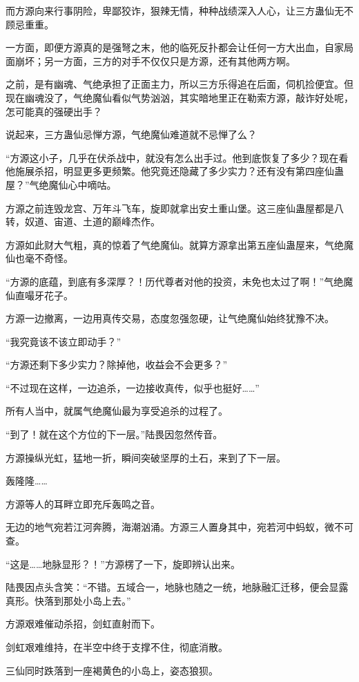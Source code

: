 \begin{this_body}
而方源向来行事阴险，卑鄙狡诈，狠辣无情，种种战绩深入人心，让三方蛊仙无不顾忌重重。

一方面，即便方源真的是强弩之末，他的临死反扑都会让任何一方大出血，自家局面崩坏；另一方面，三方的对手不仅仅只是方源，还有其他两方啊。

之前，是有幽魂、气绝承担了正面主力，所以三方乐得追在后面，伺机捡便宜。但现在幽魂没了，气绝魔仙看似气势汹汹，其实暗地里正在勒索方源，敲诈好处呢，怎可能真的强硬出手？

说起来，三方蛊仙忌惮方源，气绝魔仙难道就不忌惮了么？

“方源这小子，几乎在伏杀战中，就没有怎么出手过。他到底恢复了多少？现在看他施展杀招，明显更多更频繁。他究竟还隐藏了多少实力？还有没有第四座仙蛊屋？”气绝魔仙心中嘀咕。

方源之前连毁龙宫、万年斗飞车，旋即就拿出安土重山堡。这三座仙蛊屋都是八转，奴道、宙道、土道的巅峰杰作。

方源如此财大气粗，真的惊着了气绝魔仙。就算方源拿出第五座仙蛊屋来，气绝魔仙也毫不奇怪。

“方源的底蕴，到底有多深厚？！历代尊者对他的投资，未免也太过了啊！”气绝魔仙直嘬牙花子。

方源一边撤离，一边用真传交易，态度忽强忽硬，让气绝魔仙始终犹豫不决。

“我究竟该不该立即动手？”

“方源还剩下多少实力？除掉他，收益会不会更多？”

“不过现在这样，一边追杀，一边接收真传，似乎也挺好……”

所有人当中，就属气绝魔仙最为享受追杀的过程了。

“到了！就在这个方位的下一层。”陆畏因忽然传音。

方源操纵光虹，猛地一折，瞬间突破坚厚的土石，来到了下一层。

轰隆隆……

方源等人的耳畔立即充斥轰鸣之音。

无边的地气宛若江河奔腾，海潮汹涌。方源三人置身其中，宛若河中蚂蚁，微不可查。

“这是……地脉显形？！”方源楞了一下，旋即辨认出来。

陆畏因点头含笑：“不错。五域合一，地脉也随之一统，地脉融汇迁移，便会显露真形。快落到那处小岛上去。”

方源艰难催动杀招，剑虹直射而下。

剑虹艰难维持，在半空中终于支撑不住，彻底消散。

三仙同时跌落到一座褐黄色的小岛上，姿态狼狈。


\end{this_body}

